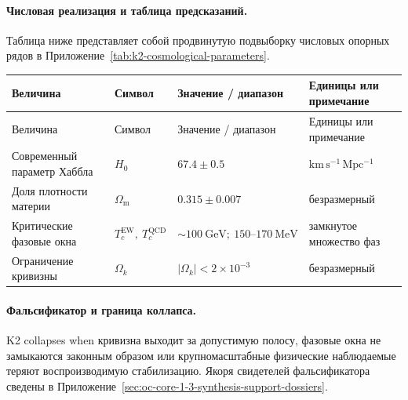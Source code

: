 \paragraph{Числовая реализация и таблица предсказаний.}
Таблица ниже представляет собой продвинутую подвыборку числовых опорных рядов в Приложение~\ref{tab:k2-cosmological-parameters}.
\begin{longtable}{@{}L{0.27\textwidth}L{0.15\textwidth}L{0.24\textwidth}L{0.16\textwidth}@{}}
\toprule
Величина & Символ & Значение / диапазон & Единицы или примечание \\
\midrule
\endfirsthead
\toprule
Величина & Символ & Значение / диапазон & Единицы или примечание \\
\midrule
\endhead
Современный параметр Хаббла & $\scriptstyle H_0$ & $67.4 \pm 0.5$ & $\mathrm{km\,s^{-1}\,Mpc^{-1}}$ \\
Доля плотности материи & $\scriptstyle \Omega_{\mathrm{m}}$ & $0.315 \pm 0.007$ & безразмерный \\
Критические фазовые окна & $\scriptstyle T_c^{\mathrm{EW}},\allowbreak \ T_c^{\mathrm{QCD}}$ & $\sim 100\ \mathrm{GeV};\allowbreak \ 150\text{--}170\ \mathrm{MeV}$ & замкнутое множество фаз \\
Ограничение кривизны & $\scriptstyle \Omega_k$ & $|\Omega_k| < 2 \times 10^{-3}$ & безразмерный \\
\bottomrule
\end{longtable}

\paragraph{Фальсификатор и граница коллапса.}
K2 collapses when кривизна выходит за допустимую полосу, фазовые окна не замыкаются законным образом или крупномасштабные физические наблюдаемые теряют воспроизводимую стабилизацию.
Якоря свидетелей фальсификатора сведены в Приложение~\ref{sec:oc-core-1-3-synthesis-support-dossiers}.

